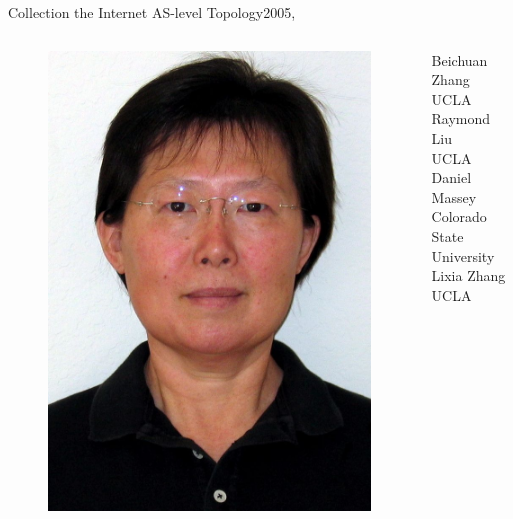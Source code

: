 \documentclass[ngerman,compress,hyperref={bookmarks}]{beamer}
\begin{document}
\begin{frame}{Collection the Internet AS-level Topology}{2005, \cite{Zhang:2005:CIA:1052812.1052825}}
\begin{columns}[c]
\begin{column}{0.08\textwidth}
\begin{figure}
        \includegraphics[width=1\textwidth]{images/zhang_l}
      \end{figure}
    \end{column}
    \begin{column}{0.3\textwidth}
      {\scriptsize Beichuan Zhang\\
      \vspace{0.1cm}
      UCLA\\
      \vspace{0.7cm}
      Raymond Liu\\
      \vspace{0.1cm}
      UCLA\\
      \vspace{0.3cm}
      Daniel Massey\\
      \vspace{0.1cm}
      Colorado State University\\
      \vspace{0.3cm}
      Lixia Zhang\\
      \vspace{0.1cm}
      UCLA\\ }
    \end{column}
  \end{columns}
\end{frame}
\end{document}
